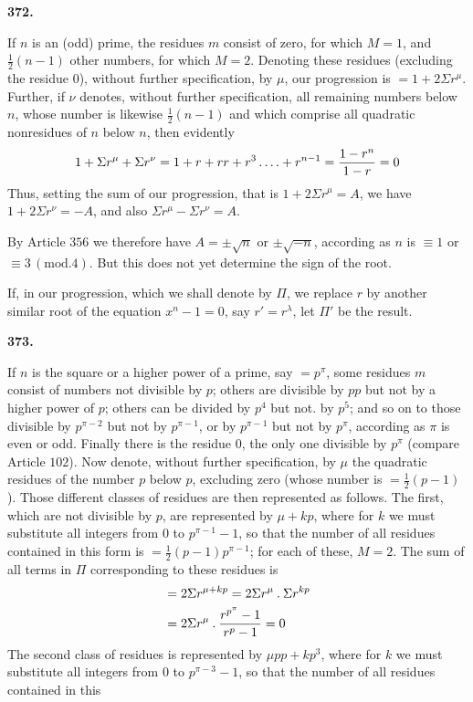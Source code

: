 \par\medskip{}\centerline{\textbf{372.}}\nobreak\smallskip
If $n$ is an (odd) prime, the residues $m$ consist of zero, for which $M=1$, and $\frac12(n-1)$ other numbers, for which $M=2$. Denoting these residues (excluding the residue $0$), without further specification, by $\mu$, our progression is $=1+2\Sigma r^\mu$. Further, if $\nu$ denotes, without further specification, all remaining numbers below $n$, whose number is likewise $\frac12(n-1)$ and which comprise all quadratic nonresidues of $n$ below $n$, then evidently
\[
1+\Sigma r^\mu+\Sigma r^\nu=1+r+rr+r^3\mathinner{.\,.\,.\,.}+r^{n-1}=\frac{1-r^n}{1-r}=0
\]
Thus, setting the sum of our progression, that is $1+2\Sigma r^\mu=A$, we have $1+2\Sigma r^\nu=-A$, and also $\Sigma r^\mu-\Sigma r^\nu=A$.
\par By Article $356$ we therefore have $A=\pm\surd n$ or $\pm\surd{-n}$, according as $n$ is $\equiv1$ or $\equiv3\, (\mathrm{mod}.4)$. But this does not yet determine the sign of the root.
\par If, in our progression, which we shall denote by $\Pi$, we replace $r$ by another similar root of the equation $x^n-1=0$, say $r'=r^\lambda$, let $\Pi'$ be the result.
\par\medskip{}\centerline{\textbf{373.}}\nobreak\smallskip
If $n$ is the square or a higher power of a prime, say $=p^\pi$, some residues $m$ consist of numbers not divisible by $p$; others are divisible by $pp$ but not by a higher power of $p$; others can be divided by $p^4$ but not. by $p^5$; and so on to those divisible by $p^{\pi-2}$ but not by $p^{\pi-1}$, or by $p^{\pi-1}$ but not by $p^\pi$, according as $\pi$ is even or odd. Finally there is the residue $0$, the only one divisible by $p^\pi$ (compare Article $102$). Now denote, without further specification, by $\mu$ the quadratic residues of the number $p$ below $p$, excluding zero (whose number is $=\frac12(p-1)$). Those different classes of residues are then represented as follows. The first, which are not divisible by $p$, are represented by $\mu+kp$, where for $k$ we must substitute all integers from $0$ to $p^{\pi-1}-1$, so that the number of all residues contained in this form is $=\frac12(p-1)p^{\pi-1}$; for each of these, $M=2$. The sum of all terms in $\Pi$ corresponding to these residues is
\[
\begin{aligned}
&=2\Sigma r^{\mu+kp}=2\Sigma r^\mu\mathbin{.}\Sigma r^{kp}\\
&=2\Sigma r^\mu\mathbin{.}\frac{r^{p^\pi}-1}{r^p-1}=0
\end{aligned}
\]
The second class of residues is represented by $\mu pp+kp^3$, where for $k$ we must substitute all integers from $0$ to $p^{\pi-3}-1$, so that the number of all residues contained in this
